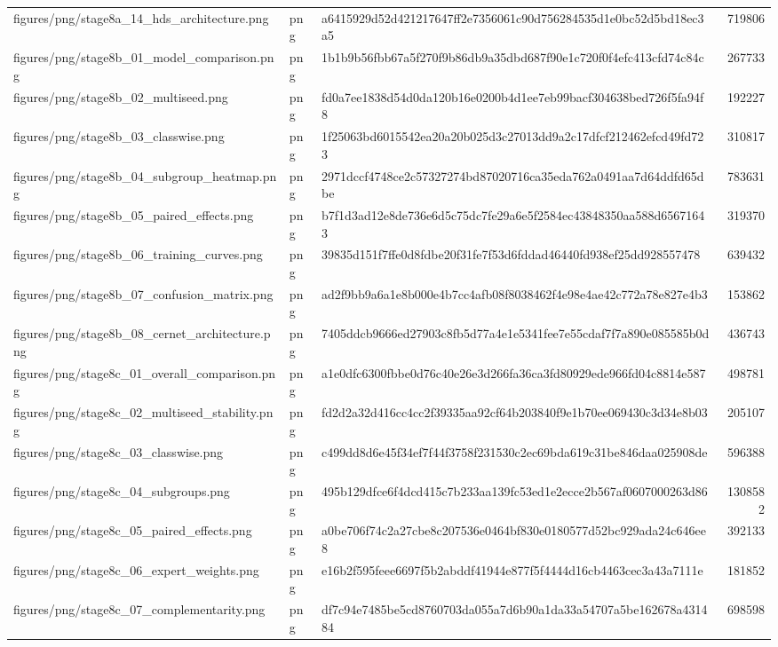 \begin{tabular}{lllr}
figures/png/stage8a_14_hds_architecture.png & png & a6415929d52d421217647ff2e7356061c90d756284535d1e0bc52d5bd18ec3a5 & 719806 \\
figures/png/stage8b_01_model_comparison.png & png & 1b1b9b56fbb67a5f270f9b86db9a35dbd687f90e1c720f0f4efc413cfd74c84c & 267733 \\
figures/png/stage8b_02_multiseed.png & png & fd0a7ee1838d54d0da120b16e0200b4d1ee7eb99bacf304638bed726f5fa94f8 & 192227 \\
figures/png/stage8b_03_classwise.png & png & 1f25063bd6015542ea20a20b025d3c27013dd9a2c17dfcf212462efcd49fd723 & 310817 \\
figures/png/stage8b_04_subgroup_heatmap.png & png & 2971dccf4748ce2c57327274bd87020716ca35eda762a0491aa7d64ddfd65dbe & 783631 \\
figures/png/stage8b_05_paired_effects.png & png & b7f1d3ad12e8de736e6d5c75dc7fe29a6e5f2584ec43848350aa588d65671643 & 319370 \\
figures/png/stage8b_06_training_curves.png & png & 39835d151f7ffe0d8fdbe20f31fe7f53d6fddad46440fd938ef25dd928557478 & 639432 \\
figures/png/stage8b_07_confusion_matrix.png & png & ad2f9bb9a6a1e8b000e4b7cc4afb08f8038462f4e98e4ae42c772a78e827e4b3 & 153862 \\
figures/png/stage8b_08_cernet_architecture.png & png & 7405ddcb9666ed27903c8fb5d77a4e1e5341fee7e55cdaf7f7a890e085585b0d & 436743 \\
figures/png/stage8c_01_overall_comparison.png & png & a1e0dfc6300fbbe0d76c40e26e3d266fa36ca3fd80929ede966fd04c8814e587 & 498781 \\
figures/png/stage8c_02_multiseed_stability.png & png & fd2d2a32d416cc4cc2f39335aa92cf64b203840f9e1b70ee069430c3d34e8b03 & 205107 \\
figures/png/stage8c_03_classwise.png & png & c499dd8d6e45f34ef7f44f3758f231530c2ec69bda619c31be846daa025908de & 596388 \\
figures/png/stage8c_04_subgroups.png & png & 495b129dfce6f4dcd415c7b233aa139fc53ed1e2ecce2b567af0607000263d86 & 1308582 \\
figures/png/stage8c_05_paired_effects.png & png & a0be706f74c2a27cbe8c207536e0464bf830e0180577d52bc929ada24c646ee8 & 392133 \\
figures/png/stage8c_06_expert_weights.png & png & e16b2f595feee6697f5b2abddf41944e877f5f4444d16cb4463cec3a43a7111e & 181852 \\
figures/png/stage8c_07_complementarity.png & png & df7c94e7485be5cd8760703da055a7d6b90a1da33a54707a5be162678a431484 & 698598 \\

\end{tabular}

